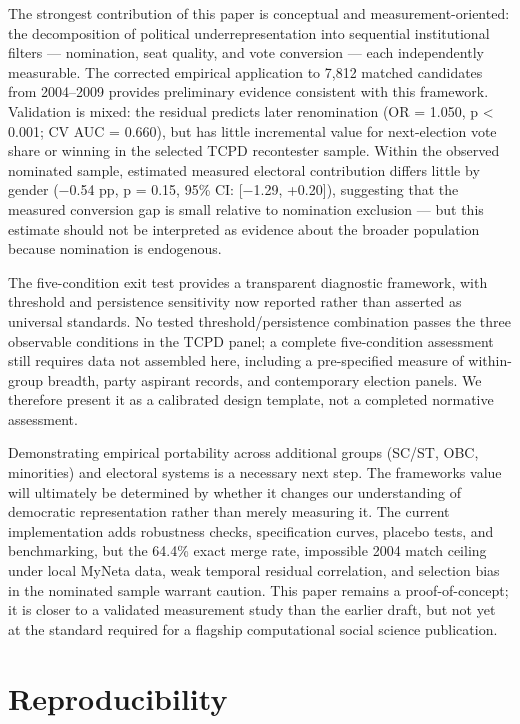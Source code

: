 \documentclass[
]{article}
\begin{document}
The strongest contribution of this paper is conceptual and measurement-oriented: the decomposition of political underrepresentation into sequential institutional filters --- nomination, seat quality, and vote conversion --- each independently measurable. The corrected empirical application to 7,812 matched candidates from 2004--2009 provides preliminary evidence consistent with this framework. Validation is mixed: the residual predicts later renomination (OR = 1.050, p \textless{} 0.001; CV AUC = 0.660), but has little incremental value for next-election vote share or winning in the selected TCPD recontester sample. Within the observed nominated sample, estimated measured electoral contribution differs little by gender ($-$0.54 pp, p = 0.15, 95\% CI: {[}$-$1.29, +0.20{]}), suggesting that the measured conversion gap is small relative to nomination exclusion --- but this estimate should not be interpreted as evidence about the broader population because nomination is endogenous.

The five-condition exit test provides a transparent diagnostic framework, with threshold and persistence sensitivity now reported rather than asserted as universal standards. No tested threshold/persistence combination passes the three observable conditions in the TCPD panel; a complete five-condition assessment still requires data not assembled here, including a pre-specified measure of within-group breadth, party aspirant records, and contemporary election panels. We therefore present it as a calibrated design template, not a completed normative assessment.

Demonstrating empirical portability across additional groups (SC/ST, OBC, minorities) and electoral systems is a necessary next step. The framework\textquotesingle s value will ultimately be determined by whether it changes our understanding of democratic representation rather than merely measuring it. The current implementation adds robustness checks, specification curves, placebo tests, and benchmarking, but the 64.4\% exact merge rate, impossible 2004 match ceiling under local MyNeta data, weak temporal residual correlation, and selection bias in the nominated sample warrant caution. This paper remains a proof-of-concept; it is closer to a validated measurement study than the earlier draft, but not yet at the standard required for a flagship computational social science publication.

\section{Reproducibility}\label{reproducibility}
\end{document}
